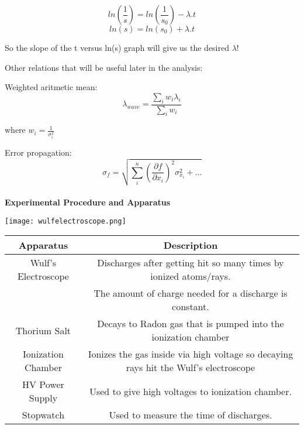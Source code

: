 \documentclass[10pt,a4paper]{article}
\begin{document}
{  	\begin{equation}
  	ln(\frac{1}{s})=ln(\frac{1}{s_0})-\lambda.t
  	\end{equation}
 \begin{equation}
 ln(s)=ln(s_0)+\lambda.t
 \end{equation}
 \par So the slope of the t versus ln(s) graph will give us the desired $\lambda$!
\newpage
\par Other relations that will be useful later in the analysis:
\\[\baselineskip]
\par Weighted aritmetic mean:
	\begin{equation}
\lambda_{wave}=\frac{\sum _{i}{w}_{i}{\lambda }_{i}}{\sum _{i}{w}_{i}}
\end{equation}
\par where $w_i=\frac{1}{\sigma^2_i}$
\\[\baselineskip]
\par Error propagation:
\begin{equation}
{\sigma }_{f}=\sqrt{\sum _{i}^{n}{\left(\frac{\partial f}{\partial {x}_{i}}\right)}^{2}{\sigma }_{{x}_{i}}^{2}+\dots }
\end{equation}
\\[\baselineskip]
\textbf{Experimental Procedure and Apparatus}\\[\baselineskip]
\begin{center}
	\advance\leftskip-1cm
	\texttt{[image: wulfelectroscope.png]}
\end{center}
\begin{center}
	\advance\leftskip-4cm
	\begin{tabular}{|c |c|} \hline
		Apparatus & Description \\ [0.5ex] 
		\hline
		Wulf's Electroscope & Discharges after getting hit so many times by ionized atoms/rays.\\ & The amount of charge needed for a discharge is constant. \\ 
		\hline
		Thorium Salt  & Decays to Radon gas that is pumped into the ionization chamber  \\
		\hline
		Ionization Chamber & Ionizes the gas inside via high voltage so decaying rays hit the Wulf's electroscope \\
		\hline
		HV Power Supply &Used to give high voltages to ionization chamber.\\
		\hline
		Stopwatch &Used to measure the time of discharges. \\
		\hline
	\end{tabular}
\end{center}

}
\end{document}
